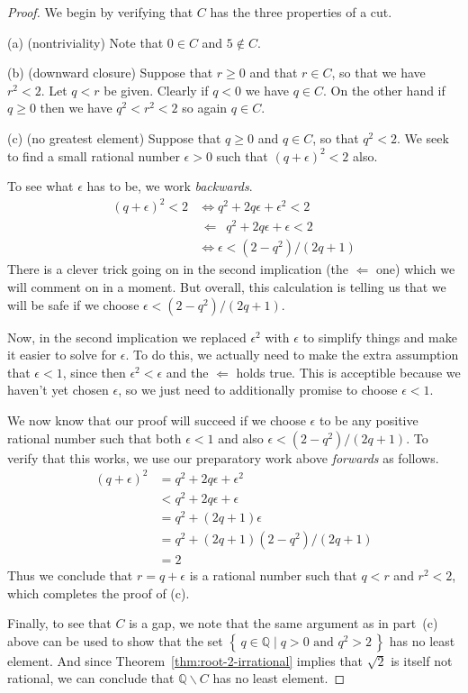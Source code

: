 \documentclass[11pt,oneside]{amsbook}
\newcommand{\set}[1]{\left\{\,#1\,\right\}}
\newcommand{\Q}{\mathbb Q}
\renewcommand{\setminus}{\smallsetminus}
\theoremstyle{definition}
\theoremstyle{plain}
\theoremstyle{definition}
\theoremstyle{remark}
\numberwithin{equation}{section}
\numberwithin{figure}{section}
\begin{document}
\begin{proof}
  We begin by verifying that $C$ has the three properties of a cut.

  (a) (nontriviality) Note that $0\in C$ and $5\notin C$.

  (b) (downward closure) Suppose that $r\geq0$ and that $r\in C$, so that we have $r^2<2$. Let $q<r$ be given. Clearly if $q<0$ we have $q\in C$. On the other hand if $q\geq0$ then we have $q^2<r^2<2$ so again $q\in C$.

  (c) (no greatest element) Suppose that $q\geq0$ and $q\in C$, so that $q^2<2$. We seek to find a small rational number $\epsilon>0$ such that $(q+\epsilon)^2<2$ also.

  To see what $\epsilon$ has to be, we work \emph{backwards}.
  \begin{align*}
    (q+\epsilon)^2<2&\iff q^2+2q\epsilon+\epsilon^2<2\\
    &\,\Longleftarrow\,\,\, q^2+2q\epsilon+\epsilon<2\\
    &\iff \epsilon<(2-q^2)/(2q+1)
  \end{align*}
  There is a clever trick going on in the second implication (the $\Longleftarrow$ one) which we will comment on in a moment. But overall, this calculation is telling us that we will be safe if we choose $\epsilon<(2-q^2)/(2q+1)$.

  Now, in the second implication we replaced $\epsilon^2$ with $\epsilon$ to simplify things and make it easier to solve for $\epsilon$. To do this, we actually need to make the extra assumption that $\epsilon<1$, since then $\epsilon^2<\epsilon$ and the $\Longleftarrow$ holds true. This is acceptible because we haven't yet chosen $\epsilon$, so we just need to additionally promise to choose $\epsilon<1$.

  We now know that our proof will succeed if we choose $\epsilon$ to be any positive rational number such that both $\epsilon<1$ and also $\epsilon<(2-q^2)/(2q+1)$. To verify that this works, we use our preparatory work above \emph{forwards} as follows.
  \begin{align*}
    (q+\epsilon)^2&=q^2+2q\epsilon+\epsilon^2\\
    &<q^2+2q\epsilon+\epsilon\\
    &=q^2+(2q+1)\epsilon\\
    &=q^2+(2q+1)(2-q^2)/(2q+1)\\
    &=2
  \end{align*}
  Thus we conclude that $r=q+\epsilon$ is a rational number such that $q<r$ and $r^2<2$, which completes the proof of (c).

  Finally, to see that $C$ is a gap, we note that the same argument as in part~(c) above can be used to show that the set $\set{q\in\Q\mid q>0\text{ and }q^2>2}$ has no least element. And since Theorem~\ref{thm:root-2-irrational} implies that $\sqrt2$ is itself not rational, we can conclude that $\Q\setminus C$ has no least element.
\end{proof}
\end{document}
